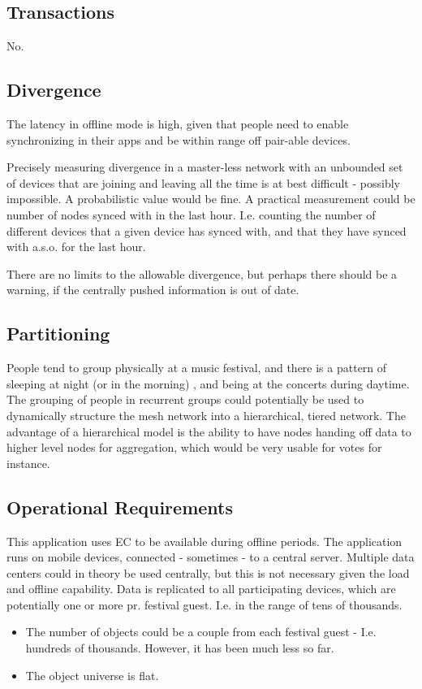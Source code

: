 \documentclass[11pt,a4paper]{report}
\begin{document}
\subsection{Transactions}
No.

\subsection{Divergence}
The latency in offline mode is high, given that people need to enable synchronizing in their apps and be within range off pair-able devices.

Precisely measuring divergence in a master-less network with an unbounded set of devices that are joining and leaving all the time is at best difficult - possibly impossible. A probabilistic value would be fine.
A practical measurement could be number of nodes synced with in the last hour. I.e. counting the number of different devices that a given device has synced with, and that they have synced with a.s.o. for the last hour.

There are no limits to the allowable divergence, but perhaps there should be a warning, if the centrally pushed information is out of date.

\subsection{Partitioning}
People tend to group physically at a music festival, and there is a pattern of sleeping at night (or in the morning) , and being at the concerts during daytime.
The grouping of people in recurrent groups could potentially be used to dynamically structure the mesh network into a hierarchical, tiered network.
The advantage of a hierarchical model is the ability to have nodes handing off data to higher level nodes for aggregation, which would be very usable for votes for instance.
\subsection{Operational Requirements}
This application uses EC to be available during offline periods.
The application runs on mobile devices, connected - sometimes - to a central server.
Multiple data centers could in theory be used centrally, but this is not necessary given the load and offline capability.
Data is replicated to all participating devices, which are potentially one or more pr. festival guest. I.e. in the range of tens of thousands.
\begin{itemize}
\item The number of objects could be a couple from each festival guest - I.e. hundreds of thousands. However, it has been much less so far.
\item The object universe is flat.
\end{itemize}
\end{document}
